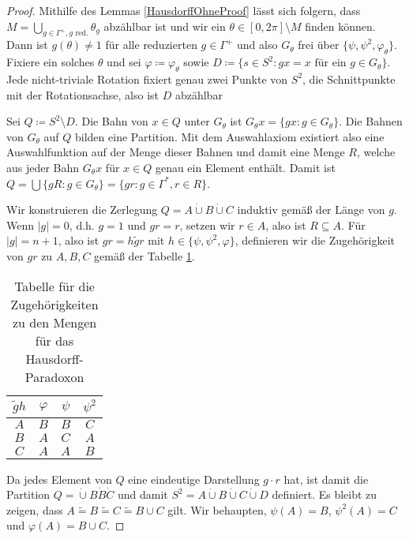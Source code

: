 \begin{proof}
	Mithilfe des Lemmas \ref{HausdorffOhneProof} lässt sich folgern, dass $M=\bigcup\limits_{g\in\Gamma^+, g\text{ red.}}\theta_g$ abzählbar ist und wir ein $\theta\in [0,2\pi]\setminus M$ finden können. Dann ist $g(\theta)\neq 1$ für alle reduzierten $g\in\Gamma^+$ und also $G_\theta$ frei über $\{\psi,\psi^2,\varphi_\theta\}$. Fixiere ein solches $\theta$ und sei $\varphi\coloneqq\varphi_\theta$ sowie $D\coloneqq\{s\in S^2 : gx=x\text{ für ein } g\in G_\theta\}$. Jede nicht-triviale Rotation fixiert genau zwei Punkte von $S^2$, die Schnittpunkte mit der Rotationsachse, also ist $D$ abzählbar
	
	Sei $Q\coloneqq S^2\setminus D$. Die Bahn von $x\in Q$ unter $G_\theta$ ist $G_\theta x=\{gx : g\in G_\theta\}$. Die Bahnen von $G_\theta$ auf $Q$ bilden eine Partition. Mit dem Auswahlaxiom existiert also eine Auswahlfunktion auf der Menge dieser Bahnen und damit eine Menge $R$, welche aus jeder Bahn $G_\theta x$ für $x\in Q$ genau ein Element enthält. Damit ist $Q=\bigcup\{gR : g\in G_\theta\}=\{gr : g\in\Gamma^\ast,r\in R\}$.
	
	Wir konstruieren die Zerlegung $Q=A\dot{\cup} B \dot{\cup}C$ induktiv gemäß der Länge von $g$. Wenn $\vert g \vert=0$, d.h. $g=1$ und $gr=r$, setzen wir $r\in A$, also ist $R\subseteq A$. Für $\vert g \vert = n+1$, also ist $gr=h\tilde{g}r$ mit $h\in\{\psi,\psi^2,\varphi\}$, definieren wir die Zugehörigkeit von $gr$ zu $A,B,C$ gemäß der Tabelle \ref{HausdorffTabelle}.
	\begin{table}[h]
		\begin{center}
			\begin{tabular}{c|ccc}
				$\tilde{g}h$ & $\varphi$ & $\psi$ & $\psi^2$ \\
				\hline
				$A$ & $B$ & $B$ & $C$ \\
				$B$ & $A$ & $C$ & $A$ \\
				$C$ & $A$ & $A$ & $B$ \\
			\end{tabular}
		\end{center}
		\caption{Tabelle für die Zugehörigkeiten zu den Mengen für das Hausdorff-Paradoxon}
		\label{HausdorffTabelle}
	\end{table}

	Da jedes Element von $Q$ eine eindeutige Darstellung $g\cdot r$ hat, ist damit die Partition $Q=\dot{\cup}B\dot{B}\dot{C}$ und damit $S^2=A\dot{\cup}B\dot{\cup}C\dot{\cup}D$ definiert. Es bleibt zu zeigen, dass $A\widetilde{=}B\widetilde{=}C\widetilde{=}B\cup C$ gilt. Wir behaupten, $\psi(A)=B$, $\psi^2(A)=C$ und $\varphi(A)=B\cup C$.
	\par
	

\end{proof}
